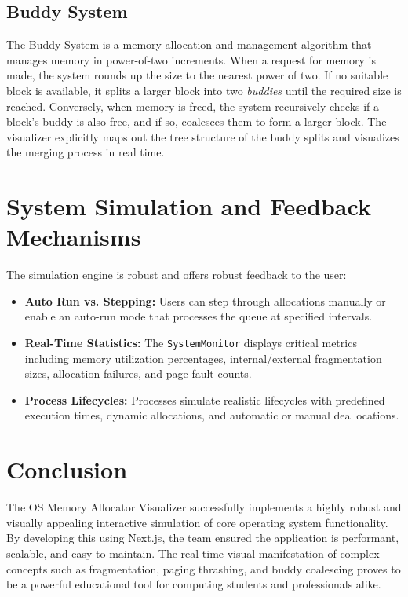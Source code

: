 \documentclass[conference]{IEEEtran}
\begin{document}
\subsection{Buddy System}
The Buddy System is a memory allocation and management algorithm that manages memory in power-of-two increments. When a request for memory is made, the system rounds up the size to the nearest power of two. If no suitable block is available, it splits a larger block into two \textit{buddies} until the required size is reached. Conversely, when memory is freed, the system recursively checks if a block's buddy is also free, and if so, coalesces them to form a larger block. The visualizer explicitly maps out the tree structure of the buddy splits and visualizes the merging process in real time.

\section{System Simulation and Feedback Mechanisms}
The simulation engine is robust and offers robust feedback to the user:
\begin{itemize}
    \item \textbf{Auto Run vs. Stepping:} Users can step through allocations manually or enable an auto-run mode that processes the queue at specified intervals.
    \item \textbf{Real-Time Statistics:} The \texttt{SystemMonitor} displays critical metrics including memory utilization percentages, internal/external fragmentation sizes, allocation failures, and page fault counts.
    \item \textbf{Process Lifecycles:} Processes simulate realistic lifecycles with predefined execution times, dynamic allocations, and automatic or manual deallocations.
\end{itemize}

\section{Conclusion}
The OS Memory Allocator Visualizer successfully implements a highly robust and visually appealing interactive simulation of core operating system functionality. By developing this using Next.js, the team ensured the application is performant, scalable, and easy to maintain. The real-time visual manifestation of complex concepts such as fragmentation, paging thrashing, and buddy coalescing proves to be a powerful educational tool for computing students and professionals alike.
\end{document}
